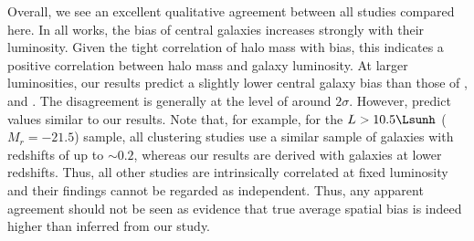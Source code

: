 \documentclass[fleqn,usenatbib,useAMS]{mnras}
\begin{document}
Overall, we see an excellent qualitative agreement between all studies compared here. In all works, the bias of central galaxies increases strongly with their luminosity. Given the tight correlation of halo mass with bias, this indicates a positive correlation between halo mass and galaxy luminosity. At larger luminosities, our results predict a slightly lower central galaxy bias than those of \cite{Guo+15b}, \cite{Vakili+16} and \cite{Sinha+17}. The disagreement is generally at the level of around $2 \sigma$. However, \cite{Zentner+16} predict values similar to our results. Note that, for example, for the $L > 10.5 \Lsunh$ ($M_r = -21.5$) sample, all clustering studies use a similar sample of galaxies with redshifts of up to $\sim 0.2$, whereas our results are derived with galaxies at lower redshifts. Thus, all other studies are intrinsically correlated at fixed luminosity and their findings cannot be regarded as independent. Thus, any apparent agreement should not be seen as evidence that true average spatial bias is indeed higher than inferred from our study.
\end{document}
